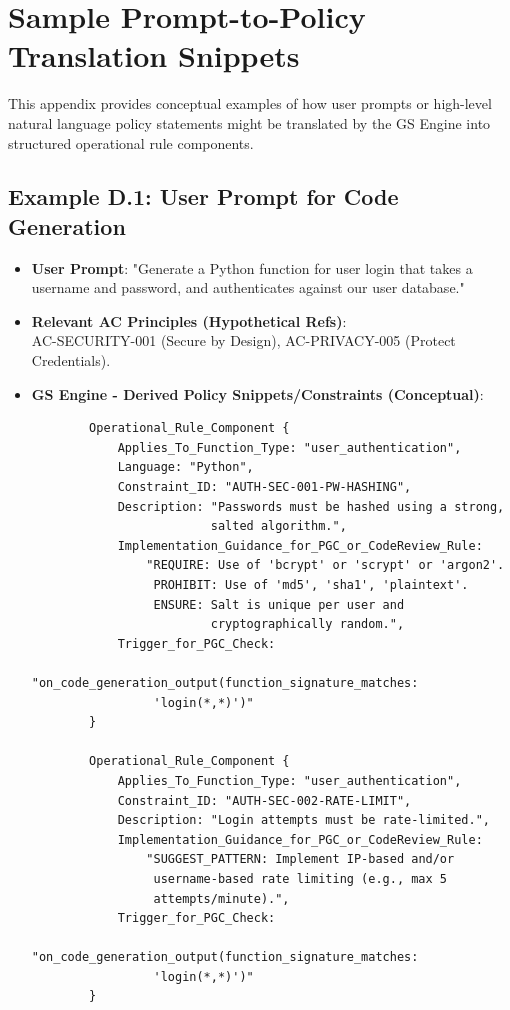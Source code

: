 \documentclass[sigconf,review,anonymous=false]{acmart} %
\begin{document}
\section{Sample Prompt-to-Policy Translation Snippets}
\label{app:prompt_to_policy}
This appendix provides conceptual examples of how user prompts or high-level natural language policy statements might be translated by the GS Engine into structured operational rule components.

\subsection{Example D.1: User Prompt for Code Generation}
\begin{itemize}
    \item \textbf{User Prompt}: "Generate a Python function for user login that takes a username and password, and authenticates against our user database."
    \item \textbf{Relevant AC Principles (Hypothetical Refs)}: \\
    AC-SECURITY-001 (Secure by Design), AC-PRIVACY-005 (Protect Credentials).
    \item \textbf{GS Engine - Derived Policy Snippets/Constraints (Conceptual)}:
        {\scriptsize
        \begin{verbatim}
        Operational_Rule_Component {
            Applies_To_Function_Type: "user_authentication",
            Language: "Python",
            Constraint_ID: "AUTH-SEC-001-PW-HASHING",
            Description: "Passwords must be hashed using a strong,
                         salted algorithm.",
            Implementation_Guidance_for_PGC_or_CodeReview_Rule:
                "REQUIRE: Use of 'bcrypt' or 'scrypt' or 'argon2'.
                 PROHIBIT: Use of 'md5', 'sha1', 'plaintext'.
                 ENSURE: Salt is unique per user and
                         cryptographically random.",
            Trigger_for_PGC_Check:
                "on_code_generation_output(function_signature_matches:
                 'login(*,*)')"
        }

        Operational_Rule_Component {
            Applies_To_Function_Type: "user_authentication",
            Constraint_ID: "AUTH-SEC-002-RATE-LIMIT",
            Description: "Login attempts must be rate-limited.",
            Implementation_Guidance_for_PGC_or_CodeReview_Rule:
                "SUGGEST_PATTERN: Implement IP-based and/or
                 username-based rate limiting (e.g., max 5
                 attempts/minute).",
            Trigger_for_PGC_Check:
                "on_code_generation_output(function_signature_matches:
                 'login(*,*)')"
        }
        \end{verbatim}
        }
\end{itemize}
\end{document}
